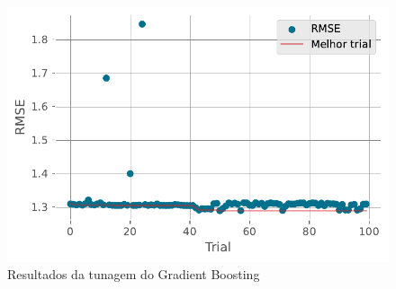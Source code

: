 \documentclass[
  12pt,
  a4paper,
]{scrreprt}
\begin{document}
\begin{figure}
\begin{minipage}{0.33\linewidth}
{\captionsetup{labelsep=none}\includegraphics{TCC_files/figure-pdf/fig-gdt_history-output-1.pdf}

}

\subcaption{\label{fig-gdt_history}}

\end{minipage}%
\newline
\begin{minipage}{\linewidth}


\subcaption{\label{fig-gdt_contour}}

\end{minipage}%

\caption{\label{fig-gdt_param}Resultados da tunagem do Gradient
Boosting}

\end{figure}%
\end{document}
